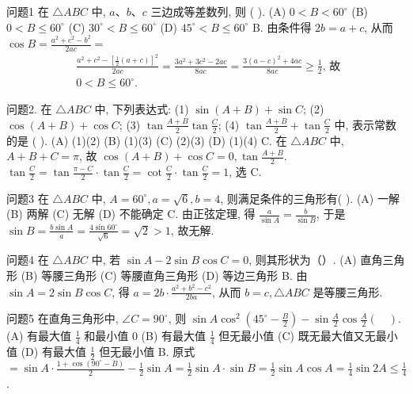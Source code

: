 
问题1 在 $\triangle A B C$ 中, $a 、 b 、 c$ 三边成等差数列, 则 ( ).
(A) $0<B<60^{\circ}$
(B) $0<B \leqslant 60^{\circ}$
(C) $30^{\circ}<B \leqslant 60^{\circ}$
(D) $45^{\circ}<B \leqslant 60^{\circ}$
B. 由条件得 $2 b=a+c$, 从而 $\cos B=\frac{a^2+c^2-b^2}{2 a c}=$
$$
\begin{aligned}
& \frac{a^2+c^2-\left[\frac{1}{2}(a+c)\right]^2}{2 a c}=\frac{3 a^2+3 c^2-2 a c}{8 a c}=\frac{3(a-c)^2+4 a c}{8 a c} \geqslant \frac{1}{2} \text {, 故 } \\
& 0<B \leqslant 60^{\circ} .
\end{aligned}
$$



问题2. 在 $\triangle A B C$ 中, 下列表达式: (1) $\sin (A+B)+\sin C$; (2) $\cos (A+B)+\cos C$;
(3) $\tan \frac{A+B}{2} \tan \frac{C}{2}$; (4) $\tan \frac{A+B}{2}+\tan \frac{C}{2}$ 中, 表示常数的是 ( ).
(A) (1)(2)
(B) (1)(3)
(C) (2)(3)
(D) (1)(4)
C. 在 $\triangle A B C$ 中, $A+B+C=\pi$, 故 $\cos (A+B)+\cos C=0, \tan \frac{A+B}{2}$. $\tan \frac{C}{2}=\tan \frac{\pi-C}{2} \cdot \tan \frac{C}{2}=\cot \frac{C}{2} \cdot \tan \frac{C}{2}=1$, 选 C.



问题3 在 $\triangle A B C$ 中, $A=60^{\circ}, a=\sqrt{6}, b=4$, 则满足条件的三角形有( ).
(A) 一解
(B) 两解
(C) 无解
(D) 不能确定
C. 由正弦定理, 得 $\frac{a}{\sin A}=\frac{b}{\sin B}$, 于是 $\sin B=\frac{b \sin A}{a}=\frac{4 \sin 60^{\circ}}{\sqrt{6}}= \sqrt{2}>1$, 故无解.



问题4 在 $\triangle A B C$ 中, 若 $\sin A-2 \sin B \cos C=0$, 则其形状为（）.
(A) 直角三角形
(B) 等腰三角形
(C) 等腰直角三角形
(D) 等边三角形
B. 由 $\sin A=2 \sin B \cos C$, 得 $a=2 b \cdot \frac{a^2+b^2-c^2}{2 b a}$, 从而 $b=c, \triangle A B C$ 是等腰三角形.



问题5 在直角三角形中, $\angle C=90^{\circ}$, 则 $\sin A \cos ^2\left(45^{\circ}-\frac{B}{2}\right)-\sin \frac{A}{2} \cos \frac{A}{2}(\quad)$.
(A) 有最大值 $\frac{1}{4}$ 和最小值 0
(B) 有最大值 $\frac{1}{4}$ 但无最小值
(C) 既无最大值又无最小值
(D) 有最大值 $\frac{1}{2}$ 但无最小值
B. 原式 $=\sin A \cdot \frac{1+\cos \left(90^{\circ}-B\right)}{2}-\frac{1}{2} \sin A=\frac{1}{2} \sin A \cdot \sin B= \frac{1}{2} \sin A \cos A=\frac{1}{4} \sin 2 A \leqslant \frac{1}{4}$.



